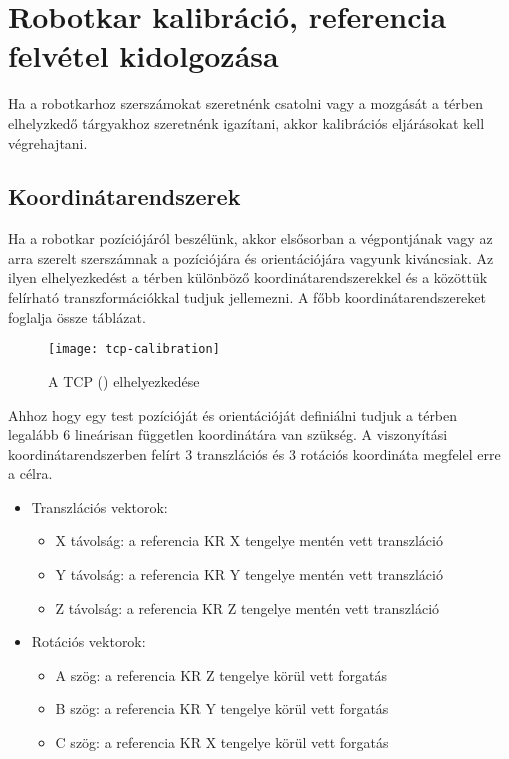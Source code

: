 \documentclass[../documentation.tex]{subfiles}
\begin{document}
\section{Robotkar kalibráció, referencia felvétel kidolgozása}
Ha a robotkarhoz szerszámokat szeretnénk csatolni vagy a mozgását a térben elhelyzkedő tárgyakhoz szeretnénk igazítani, akkor kalibrációs eljárásokat kell végrehajtani.

\subsection{Koordinátarendszerek}
Ha a robotkar pozíciójáról beszélünk, akkor elsősorban a végpontjának vagy az arra szerelt szerszámnak a pozíciójára és orientációjára vagyunk kiváncsiak. Az ilyen elhelyezkedést a térben különböző koordinátarendszerekkel és a közöttük felírható transzformációkkal tudjuk jellemezni. A főbb koordinátarendszereket foglalja össze  táblázat.

\begin{figure}[h]
	\centering
	\texttt{[image: tcp-calibration]}
	\caption{A TCP () elhelyezkedése\cite{sunrisemanual}}
	\label{fig:tcp-calibration}
\end{figure}

Ahhoz hogy egy test pozícióját és orientációját definiálni tudjuk a térben legalább 6 lineárisan független koordinátára van szükség. A viszonyítási koordinátarendszerben felírt 3 transzlációs és 3 rotációs koordináta megfelel erre a célra.
\begin{itemize}
	\item Transzlációs vektorok:
	\begin{itemize}
		\item X távolság: a referencia KR X tengelye mentén vett transzláció
		\item Y távolság: a referencia KR Y tengelye mentén vett transzláció
		\item Z távolság: a referencia KR Z tengelye mentén vett transzláció
	\end{itemize}
	\item Rotációs vektorok:
	\begin{itemize}
		\item A szög: a referencia KR Z tengelye körül vett forgatás
		\item B szög: a referencia KR Y tengelye körül vett forgatás
		\item C szög: a referencia KR X tengelye körül vett forgatás
	\end{itemize}
\end{itemize}
\end{document}
